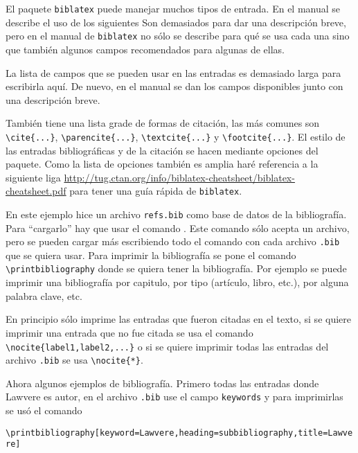 El paquete \texttt{biblatex} puede manejar muchos tipos de entrada. En el
manual se describe el uso de los siguientes
Son demasiados para dar una descripción breve, pero en el manual de
\texttt{biblatex} no sólo se describe para qué se usa cada una sino que
también algunos campos recomendados para algunas de ellas.

La lista de campos que se pueden usar en las entradas es demasiado larga para
escribirla aquí. De nuevo, en el manual se dan los campos disponibles junto
con una descripción breve.

También tiene una lista grade de formas de citación, las más comunes son
\verb|\cite{...}|, \verb|\parencite{...}|, \verb|\textcite{...}| y
\verb|\footcite{...}|. El estilo de las entradas bibliográficas y de la
citación se hacen mediante opciones del paquete. Como la lista de opciones
también es amplia haré referencia a la siguiente liga
\url{http://tug.ctan.org/info/biblatex-cheatsheet/biblatex-cheatsheet.pdf}
para tener una guía rápida de \texttt{biblatex}.

En este ejemplo hice un archivo \texttt{refs.bib} como base de datos de la
bibliografía. Para \enquote{cargarlo} hay que usar el comando
\verb||. Este comando sólo acepta un archivo, pero
se pueden cargar más escribiendo todo el comando con cada archivo
\texttt{.bib} que se quiera usar. Para imprimir la bibliografía se pone el
comando \verb|\printbibliography| donde se quiera tener la bibliografía. Por
ejemplo se puede imprimir una bibliografía por capitulo, por tipo
(artículo, libro, etc.), por alguna palabra clave, etc.

En principio sólo imprime las entradas que fueron citadas en el texto, si se
quiere imprimir una entrada que no fue citada se usa el comando
\verb|\nocite{label1,label2,...}| o si se quiere imprimir todas las entradas
del archivo \texttt{.bib} se usa \verb|\nocite{*}|.

Ahora algunos ejemplos de bibliografía. Primero todas las entradas donde
Lawvere es autor, en el archivo \texttt{.bib} use el campo \texttt{keywords}
y para imprimirlas se usó el comando
\begin{flushleft}
  \verb|\printbibliography[keyword=Lawvere,heading=subbibliography,title=Lawvere]|
\end{flushleft}
\printbibliography[keyword=Lawvere,heading=subbibliography,title=Lawvere]

